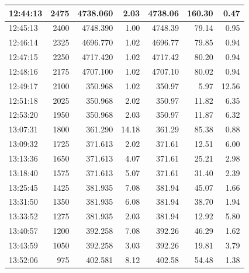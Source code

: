 \begin{table}[ht!]
\begin{adjustbox}{max width=\textwidth}
\begin{tabular}{|l|r|r|r|r|r|r|}
12:44:13 &               2475 &        4738.060 &       2.03 &        4738.06 &   160.30 &  0.47 \\ \hline
12:45:13 &               2400 &        4748.390 &       1.00 &        4748.39 &    79.14 &  0.95 \\ \hline
12:46:14 &               2325 &        4696.770 &       1.02 &        4696.77 &    79.85 &  0.94 \\ \hline
12:47:15 &               2250 &        4717.420 &       1.02 &        4717.42 &    80.20 &  0.94 \\ \hline
12:48:16 &               2175 &        4707.100 &       1.02 &        4707.10 &    80.02 &  0.94 \\ \hline
12:49:17 &               2100 &         350.968 &       1.02 &         350.97 &     5.97 & 12.56 \\ \hline
12:51:18 &               2025 &         350.968 &       2.02 &         350.97 &    11.82 &  6.35 \\ \hline
12:53:20 &               1950 &         350.968 &       2.03 &         350.97 &    11.87 &  6.32 \\ \hline
13:07:31 &               1800 &         361.290 &      14.18 &         361.29 &    85.38 &  0.88 \\ \hline
13:09:32 &               1725 &         371.613 &       2.02 &         371.61 &    12.51 &  6.00 \\ \hline
13:13:36 &               1650 &         371.613 &       4.07 &         371.61 &    25.21 &  2.98 \\ \hline
13:18:40 &               1575 &         371.613 &       5.07 &         371.61 &    31.40 &  2.39 \\ \hline
13:25:45 &               1425 &         381.935 &       7.08 &         381.94 &    45.07 &  1.66 \\ \hline
13:31:50 &               1350 &         381.935 &       6.08 &         381.94 &    38.70 &  1.94 \\ \hline
13:33:52 &               1275 &         381.935 &       2.03 &         381.94 &    12.92 &  5.80 \\ \hline
13:40:57 &               1200 &         392.258 &       7.08 &         392.26 &    46.29 &  1.62 \\ \hline
13:43:59 &               1050 &         392.258 &       3.03 &         392.26 &    19.81 &  3.79 \\ \hline
13:52:06 &                975 &         402.581 &       8.12 &         402.58 &    54.48 &  1.38 \\ \hline

\end{tabular}
\end{adjustbox}
\end{table}
